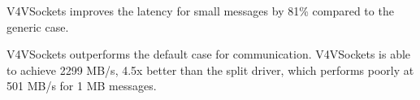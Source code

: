 \documentclass[a0paper,portrait,final]{baposter}
\begin{document}
\begin{poster}
{\begin{multicols}{2}
\hspace{0.5em}

\hspace{0.5em}

\hspace{0.5em}


V4VSockets improves the latency for small messages by 81\% compared to the
generic case. 


V4VSockets outperforms the default case for communication. V4VSockets is able
to achieve 2299 MB/s, 4.5x better than the split driver, which performs poorly
at 501 MB/s for 1 MB messages.


\end{multicols}}
\end{poster}
\end{document}
